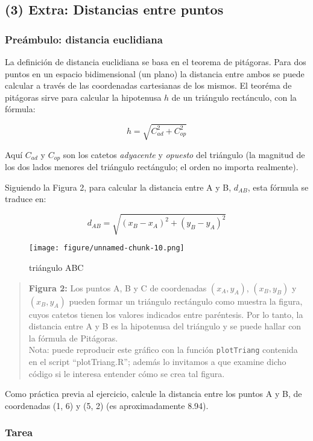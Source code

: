 \documentclass[]{article}
\makeatletter
\def\maxwidth{\ifdim\Gin@nat@width>\linewidth\linewidth
\else\Gin@nat@width\fi}
\let\Oldincludegraphics\includegraphics
\renewcommand{\includegraphics}[1]{\Oldincludegraphics[width=\maxwidth]{#1}}
\makeatother
\begin{document}
\subsection{(3) Extra: Distancias entre puntos}

\subsubsection{Preámbulo: distancia euclidiana}

La definición de distancia euclidiana se basa en el teorema de
pitágoras. Para dos puntos en un espacio bidimensional (un plano) la
distancia entre ambos se puede calcular a través de las coordenadas
cartesianas de los mismos. El teoréma de pitágoras sirve para calcular
la hipotenusa $h$ de un triángulo rectánculo, con la fórmula:

\[
  h = \sqrt{C_{ad} ^ 2 + C_{op} ^ 2}
\]

Aquí $C_{ad}$ y $C_{op}$ son los catetos \emph{adyacente} y
\emph{opuesto} del triángulo (la magnitud de los dos lados menores del
triángulo rectángulo; el orden no importa realmente).

Siguiendo la Figura 2, para calcular la distancia entre A y B, $d_{AB}$,
esta fórmula se traduce en:

\[
  d_{AB} = \sqrt{(x_B - x_A) ^ 2 + (y_B - y_A) ^ 2}
\]

\begin{figure}[htbp]
\centering
\texttt{[image: figure/unnamed-chunk-10.png]}
\caption{triángulo ABC}
\end{figure}

\begin{quote}
\textbf{Figura 2:} Los puntos A, B y C de coordenadas $(x_A, y_A)$,
$(x_B, y_B)$ y $(x_B, y_A)$ pueden formar un triángulo rectángulo como
muestra la figura, cuyos catetos tienen los valores indicados entre
paréntesis. Por lo tanto, la distancia entre A y B es la hipotenusa del
triángulo y se puede hallar con la fórmula de Pitágoras.\\Nota: puede
reproducir este gráfico con la función \texttt{plotTriang} contenida en
el script ``plotTriang.R''; además lo invitamos a que examine dicho
código si le interesa entender cómo se crea tal figura.

\end{quote}
Como práctica previa al ejercicio, calcule la distancia entre los puntos
A y B, de coordenadas (1, 6) y (5, 2) (es aproximadamente 8.94).

\subsubsection{Tarea}
\end{document}

